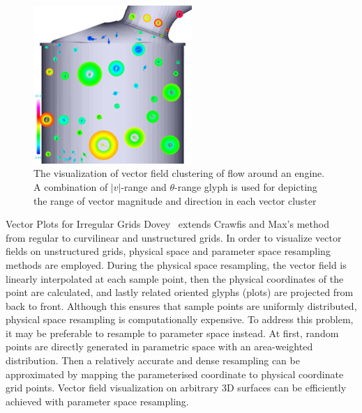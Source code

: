 \begin{figure}[t]
\centering
	\includegraphics[width = 6cm]{images/related-work-glyphs/peng12compositeGlyph}
\caption{The visualization of vector field clustering of flow around an engine. A combination of $|v|$-range and $\theta$-range glyph is used for depicting the range of vector magnitude and direction in each vector cluster~\cite{peng12meshDriven}}
\label{fig:engineFlowGlyph}
\end{figure}

Vector Plots for Irregular Grids Dovey~\cite{dovey95} extends Crawfis and Max's method~\cite{crawfisMax92} from regular to curvilinear and unstructured grids. In order to visualize vector fields on unstructured grids, physical space and parameter space resampling methods are employed. 
During the physical space resampling, the vector field is linearly interpolated at each sample point, then the physical coordinates of the point are calculated, and lastly related oriented glyphs (plots) are projected from back to front. 
Although this ensures that sample points are uniformly distributed, physical space resampling is computationally expensive. To address this problem, it may be preferable to resample to parameter space instead. 
At first, random points are directly generated in parametric space with an area-weighted distribution. Then a relatively accurate and dense resampling can be approximated by mapping the parameterised coordinate to physical coordinate grid points. Vector field visualization on arbitrary 3D surfaces can be efficiently achieved with parameter space resampling. 

